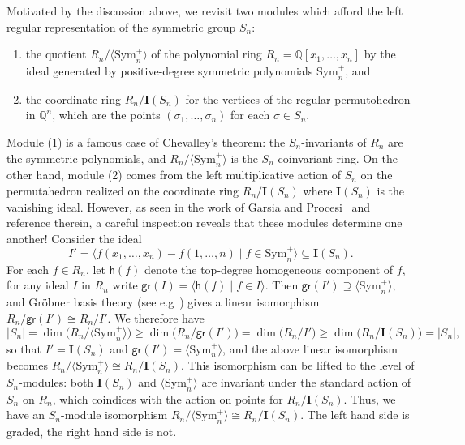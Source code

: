 \documentclass[12pt]{amsart}
\theoremstyle{definition}
\theoremstyle{remark}
\numberwithin{equation}{section}
\newcommand{\QQ}{\mathbb{Q}}
\newcommand{\Sym}{\mathrm{Sym}}
\begin{document}
Motivated by the discussion above, we revisit two modules which afford the left regular representation of the symmetric group $S_{n}$:
\begin{enumerate}[itemsep = 1ex]
\item the quotient $R_{n}/\langle \Sym_{n}^{+} \rangle$ of the polynomial ring $R_{n} = \QQ[x_{1}, \ldots, x_{n}]$ by the ideal generated by positive-degree symmetric polynomials $\Sym_{n}^{+}$, and

\item the coordinate ring $R_{n} / \mathbf{I}(S_{n})$ for the vertices of the regular permutohedron in $\QQ^{n}$, which are the points $(\sigma_{1}, \ldots, \sigma_{n})$ for each $\sigma \in S_{n}$.%

\end{enumerate}
Module (1) is a famous case of Chevalley's theorem: the $S_{n}$-invariants of $R_{n}$ are the symmetric polynomials, and $R_{n}/\langle \Sym_{n}^{+} \rangle$ is the $S_{n}$ coinvariant ring.  
On the other hand, module (2) comes from the left multiplicative action of $S_{n}$ on the permutahedron realized on the coordinate ring $R_{n} / \mathbf{I}(S_{n})$  where $\mathbf{I}(S_{n})$ is the vanishing ideal. 
However, as seen in the work of Garsia and Procesi~\cite{GP} and reference therein, a careful inspection reveals that these modules determine one another!  
Consider the ideal
\[
I' = \langle f(x_{1}, \ldots, x_{n}) - f(1, \ldots, n) \;|\; f \in \Sym_{n}^{+} \rangle \subseteq \mathbf{I}(S_{n}).
\]
For each $f \in R_{n}$, let $\mathsf{h}(f)$ denote the top-degree homogeneous component of $f$, for any ideal $I$ in $R_{n}$ write $\mathsf{gr}(I) = \langle \mathsf{h}(f) \;|\; f \in I \rangle$.  
Then $\mathsf{gr}(I') \supseteq \langle \Sym_{n}^{+} \rangle$, and Gr\"{o}bner basis theory (see e.g~\cite{CLO}) gives a linear isomorphism $R_{n}/\mathsf{gr}(I')  \cong R_{n}/I'$.  We therefore have
\[
|S_{n}| = \dim\big(R_{n}/\langle \Sym_{n}^{+} \rangle\big) \ge \dim\big(R_{n}/\mathsf{gr}(I')\big) = \dim\big(R_{n}/I') \ge \dim(R_{n}/\mathbf{I}(S_{n})\big) = |S_{n}|,
\]
so that $I' = \mathbf{I}(S_{n})$ and $\mathsf{gr}(I') = \langle \Sym_{n}^{+} \rangle$, and the above linear isomorphism becomes $R_{n}/\langle \Sym_{n}^{+} \rangle \cong R_{n}/\mathbf{I}(S_{n})$.  
This isomorphism can be lifted to the level of $S_{n}$-modules: both $\mathbf{I}(S_{n})$ and $\langle \Sym_{n}^{+} \rangle$ are invariant under the standard action of $S_{n}$ on $R_{n}$, which coindices with the action on points for $R_{n}/\mathbf{I}(S_{n})$.  
Thus, we have an $S_{n}$-module isomorphism $R_{n}/\langle \Sym_{n}^{+} \rangle \cong R_{n}/\mathbf{I}(S_{n})$.  The left hand side is graded, the right hand side is not.
\end{document}
